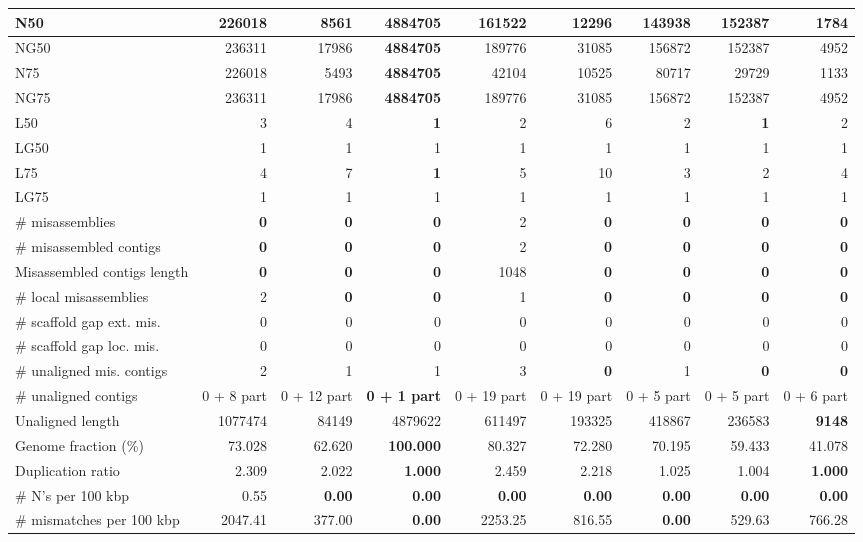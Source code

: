 \documentclass[12pt,a4paper]{article}
\begin{document}
\begin{table}[ht]
\begin{center}
\begin{tabular}{|l*{8}{|r}|}
N50 & 226018 & 8561 & {\bf 4884705} & 161522 & 12296 & 143938 & 152387 & 1784 \\ \hline
NG50 & 236311 & 17986 & {\bf 4884705} & 189776 & 31085 & 156872 & 152387 & 4952 \\ \hline
N75 & 226018 & 5493 & {\bf 4884705} & 42104 & 10525 & 80717 & 29729 & 1133 \\ \hline
NG75 & 236311 & 17986 & {\bf 4884705} & 189776 & 31085 & 156872 & 152387 & 4952 \\ \hline
L50 & 3 & 4 & {\bf 1} & 2 & 6 & 2 & {\bf 1} & 2 \\ \hline
LG50 & 1 & 1 & 1 & 1 & 1 & 1 & 1 & 1 \\ \hline
L75 & 4 & 7 & {\bf 1} & 5 & 10 & 3 & 2 & 4 \\ \hline
LG75 & 1 & 1 & 1 & 1 & 1 & 1 & 1 & 1 \\ \hline
\# misassemblies & {\bf 0} & {\bf 0} & {\bf 0} & 2 & {\bf 0} & {\bf 0} & {\bf 0} & {\bf 0} \\ \hline
\# misassembled contigs & {\bf 0} & {\bf 0} & {\bf 0} & 2 & {\bf 0} & {\bf 0} & {\bf 0} & {\bf 0} \\ \hline
Misassembled contigs length & {\bf 0} & {\bf 0} & {\bf 0} & 1048 & {\bf 0} & {\bf 0} & {\bf 0} & {\bf 0} \\ \hline
\# local misassemblies & 2 & {\bf 0} & {\bf 0} & 1 & {\bf 0} & {\bf 0} & {\bf 0} & {\bf 0} \\ \hline
\# scaffold gap ext. mis. & 0 & 0 & 0 & 0 & 0 & 0 & 0 & 0 \\ \hline
\# scaffold gap loc. mis. & 0 & 0 & 0 & 0 & 0 & 0 & 0 & 0 \\ \hline
\# unaligned mis. contigs & 2 & 1 & 1 & 3 & {\bf 0} & 1 & {\bf 0} & {\bf 0} \\ \hline
\# unaligned contigs & 0 + 8 part & 0 + 12 part & {\bf 0 + 1 part} & 0 + 19 part & 0 + 19 part & 0 + 5 part & 0 + 5 part & 0 + 6 part \\ \hline
Unaligned length & 1077474 & 84149 & 4879622 & 611497 & 193325 & 418867 & 236583 & {\bf 9148} \\ \hline
Genome fraction (\%) & 73.028 & 62.620 & {\bf 100.000} & 80.327 & 72.280 & 70.195 & 59.433 & 41.078 \\ \hline
Duplication ratio & 2.309 & 2.022 & {\bf 1.000} & 2.459 & 2.218 & 1.025 & 1.004 & {\bf 1.000} \\ \hline
\# N's per 100 kbp & 0.55 & {\bf 0.00} & {\bf 0.00} & {\bf 0.00} & {\bf 0.00} & {\bf 0.00} & {\bf 0.00} & {\bf 0.00} \\ \hline
\# mismatches per 100 kbp & 2047.41 & 377.00 & {\bf 0.00} & 2253.25 & 816.55 & {\bf 0.00} & 529.63 & 766.28 \\ \hline

\end{tabular}
\end{center}
\end{table}
\end{document}
